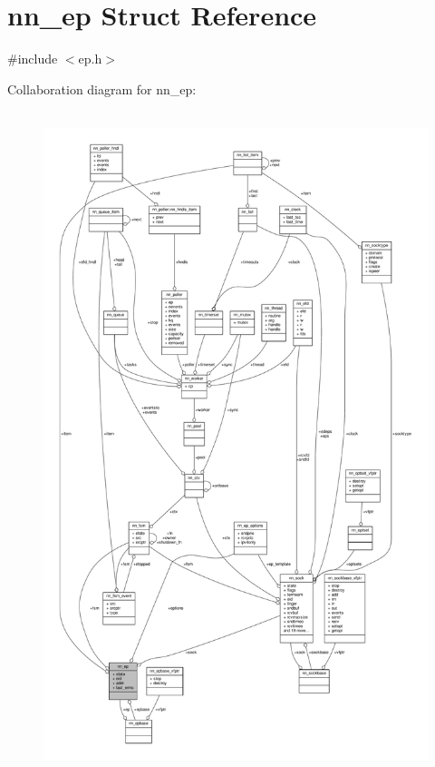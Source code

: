 \hypertarget{structnn__ep}{}\section{nn\+\_\+ep Struct Reference}
\label{structnn__ep}


{\ttfamily \#include $<$ep.\+h$>$}



Collaboration diagram for nn\+\_\+ep\+:\nopagebreak
\begin{figure}[H]
\begin{center}
\leavevmode
\includegraphics[height=550pt]{structnn__ep__coll__graph}
\end{center}
\end{figure}
